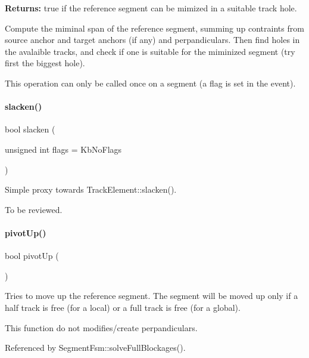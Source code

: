 {\bfseries Returns\+:} true if the reference segment can be mimized in a suitable track hole.

Compute the miminal span of the reference segment, summing up contraints from source anchor and target anchors (if any) and perpandiculars. Then find holes in the avalaible tracks, and check if one is suitable for the miminized segment (try first the biggest hole).

This operation can only be called once on a segment (a flag is set in the event). \mbox{\label{classKite_1_1Manipulator_a82897c077e4c0d4281c3dce3e37ab997}} 
\paragraph{\texorpdfstring{slacken()}{slacken()}}
{\footnotesize\ttfamily bool slacken (\begin{DoxyParamCaption}\item[{unsigned int}]{flags = {\ttfamily KbNoFlags} }\end{DoxyParamCaption})}

Simple proxy towards Track\+Element\+::slacken().

To be reviewed. \mbox{\label{classKite_1_1Manipulator_ad590137c4e7e8d5ad2a6f510e0d70e81}} 
\paragraph{\texorpdfstring{pivot\+Up()}{pivotUp()}}
{\footnotesize\ttfamily bool pivot\+Up (\begin{DoxyParamCaption}{ }\end{DoxyParamCaption})}

Tries to move up the reference segment. The segment will be moved up only if a half track is free (for a local) or a full track is free (for a global).

This function do not modifies/create perpandiculars. 

Referenced by Segment\+Fsm\+::solve\+Full\+Blockages().

\mbox{\label{classKite_1_1Manipulator_ac3b48ad16d9b9b63d1c68e526ceb42e8}} 
